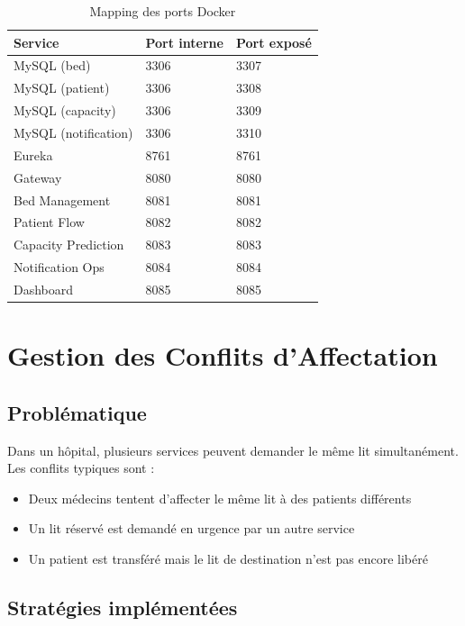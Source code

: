 \documentclass[12pt,a4paper]{report}
\begin{document}
\begin{table}[H]
    \centering
    \begin{tabular}{lll}
        \toprule
        \textbf{Service} & \textbf{Port interne} & \textbf{Port expos\'e} \\
        \midrule
        MySQL (bed) & 3306 & 3307 \\
        MySQL (patient) & 3306 & 3308 \\
        MySQL (capacity) & 3306 & 3309 \\
        MySQL (notification) & 3306 & 3310 \\
        Eureka & 8761 & 8761 \\
        Gateway & 8080 & 8080 \\
        Bed Management & 8081 & 8081 \\
        Patient Flow & 8082 & 8082 \\
        Capacity Prediction & 8083 & 8083 \\
        Notification Ops & 8084 & 8084 \\
        Dashboard & 8085 & 8085 \\
        \bottomrule
    \end{tabular}
    \caption{Mapping des ports Docker}
\end{table}

\chapter{Gestion des Conflits d'Affectation}

\section{Probl\'ematique}

Dans un h\^opital, plusieurs services peuvent demander le m\^eme lit simultan\'ement. Les conflits typiques sont :

\begin{itemize}
    \item Deux m\'edecins tentent d'affecter le m\^eme lit \`a des patients diff\'erents
    \item Un lit r\'eserv\'e est demand\'e en urgence par un autre service
    \item Un patient est transf\'er\'e mais le lit de destination n'est pas encore lib\'er\'e
\end{itemize}

\section{Strat\'egies impl\'ement\'ees}
\end{document}
